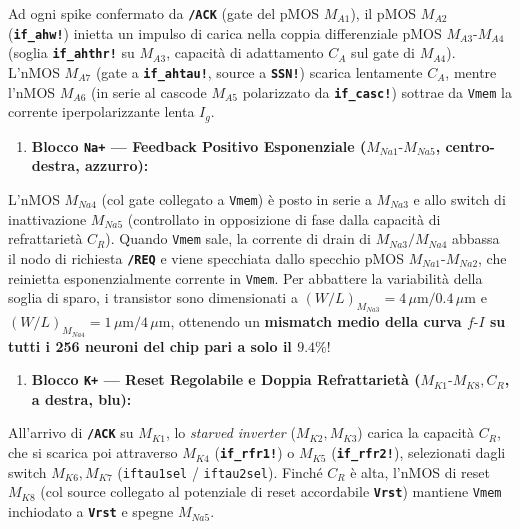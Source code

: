 \documentclass[11pt,a4paper]{article}
\begin{document}
Ad ogni spike confermato da \textbf{\texttt{/ACK}} (gate del pMOS \textbf{$M_{A1}$}), il pMOS \textbf{$M_{A2}$} (\textbf{\texttt{if\_ahw!}}) inietta un impulso di carica nella coppia differenziale pMOS \textbf{$M_{A3}\text{-}M_{A4}$} (soglia \textbf{\texttt{if\_ahthr!}} su $M_{A3}$, capacità di adattamento \textbf{$C_A$} sul gate di $M_{A4}$). L'nMOS \textbf{$M_{A7}$} (gate a \textbf{\texttt{if\_ahtau!}}, source a \textbf{\texttt{SSN!}}) scarica lentamente $C_A$, mentre l'nMOS \textbf{$M_{A6}$} (in serie al cascode \textbf{$M_{A5}$} polarizzato da \textbf{\texttt{if\_casc!}}) sottrae da \texttt{Vmem} la corrente iperpolarizzante lenta $I_g$.
\begin{enumerate}
  \item \textbf{Blocco \texttt{Na+} --- Feedback Positivo Esponenziale ($M_{Na1}\text{-}M_{Na5}$, centro-destra, azzurro):}
\end{enumerate}
L'nMOS \textbf{$M_{Na4}$} (col gate collegato a \texttt{Vmem}) è posto in serie a \textbf{$M_{Na3}$} e allo switch di inattivazione \textbf{$M_{Na5}$} (controllato in opposizione di fase dalla capacità di refrattarietà $C_R$). Quando \texttt{Vmem} sale, la corrente di drain di $M_{Na3}/M_{Na4}$ abbassa il nodo di richiesta \textbf{\texttt{/REQ}} e viene specchiata dallo specchio pMOS \textbf{$M_{Na1}\text{-}M_{Na2}$}, che reinietta esponenzialmente corrente in \texttt{Vmem}. Per abbattere la variabilità della soglia di sparo, i transistor sono dimensionati a \textbf{$(W/L)_{M_{Na3}} = 4\,\mu\text{m}/0.4\,\mu\text{m}$} e \textbf{$(W/L)_{M_{Na4}} = 1\,\mu\text{m}/4\,\mu\text{m}$}, ottenendo un \textbf{mismatch medio della curva $f\text{-}I$ su tutti i 256 neuroni del chip pari a solo il $9.4\%$}!
\begin{enumerate}
  \item \textbf{Blocco \texttt{K+} --- Reset Regolabile e Doppia Refrattarietà ($M_{K1}\text{-}M_{K8}, C_R$, a destra, blu):}
\end{enumerate}
All'arrivo di \textbf{\texttt{/ACK}} su \textbf{$M_{K1}$}, lo \textit{starved inverter} (\textbf{$M_{K2}, M_{K3}$}) carica la capacità \textbf{$C_R$}, che si scarica poi attraverso \textbf{$M_{K4}$} (\textbf{\texttt{if\_rfr1!}}) o \textbf{$M_{K5}$} (\textbf{\texttt{if\_rfr2!}}), selezionati dagli switch \textbf{$M_{K6}, M_{K7}$} (\texttt{iftau1sel} / \texttt{iftau2sel}). Finché $C_R$ è alta, l'nMOS di reset \textbf{$M_{K8}$} (col source collegato al potenziale di reset accordabile \textbf{\texttt{Vrst}}) mantiene \texttt{Vmem} inchiodato a \textbf{\texttt{Vrst}} e spegne $M_{Na5}$.
\end{document}
